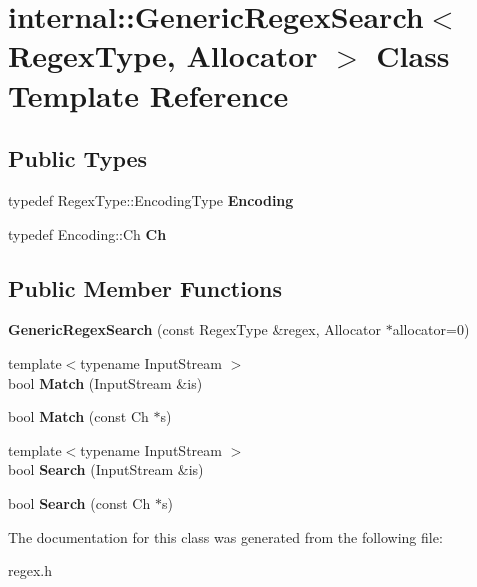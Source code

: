 \hypertarget{a00124}{}\section{internal\+:\+:Generic\+Regex\+Search$<$ Regex\+Type, Allocator $>$ Class Template Reference}
\label{a00124}
\subsection*{Public Types}
\begin{DoxyCompactItemize}
\item 
typedef Regex\+Type\+::\+Encoding\+Type {\bfseries Encoding}\hypertarget{a00124_a7b1f81c580c33200c83e1529c2fdbf54}{}\label{a00124_a7b1f81c580c33200c83e1529c2fdbf54}

\item 
typedef Encoding\+::\+Ch {\bfseries Ch}\hypertarget{a00124_a966f3a62fc838b5e9350f4c6a624d9a1}{}\label{a00124_a966f3a62fc838b5e9350f4c6a624d9a1}

\end{DoxyCompactItemize}
\subsection*{Public Member Functions}
\begin{DoxyCompactItemize}
\item 
{\bfseries Generic\+Regex\+Search} (const Regex\+Type \&regex, Allocator $\ast$allocator=0)\hypertarget{a00124_a72f70e210a4bc944dba62655a008750b}{}\label{a00124_a72f70e210a4bc944dba62655a008750b}

\item 
{\footnotesize template$<$typename Input\+Stream $>$ }\\bool {\bfseries Match} (Input\+Stream \&is)\hypertarget{a00124_ad204164a20e3ac403b405683b51c2d0b}{}\label{a00124_ad204164a20e3ac403b405683b51c2d0b}

\item 
bool {\bfseries Match} (const Ch $\ast$s)\hypertarget{a00124_a9d3fe83905549d2fd4c513b8eacd14de}{}\label{a00124_a9d3fe83905549d2fd4c513b8eacd14de}

\item 
{\footnotesize template$<$typename Input\+Stream $>$ }\\bool {\bfseries Search} (Input\+Stream \&is)\hypertarget{a00124_a766c684321471b468ff468648f186cf0}{}\label{a00124_a766c684321471b468ff468648f186cf0}

\item 
bool {\bfseries Search} (const Ch $\ast$s)\hypertarget{a00124_a97398161c60f3ed3e4aabaff952c6f1e}{}\label{a00124_a97398161c60f3ed3e4aabaff952c6f1e}

\end{DoxyCompactItemize}


The documentation for this class was generated from the following file\+:\begin{DoxyCompactItemize}
\item 
regex.\+h\end{DoxyCompactItemize}
